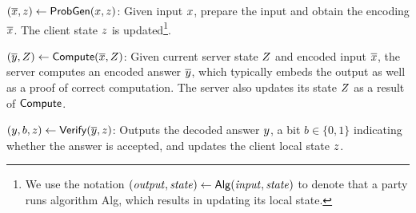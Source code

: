 \begin{description}
\item
$(\overline{x}, z) \leftarrow \mathsf{ProbGen}(x, z)$:
Given input $x$, prepare the input and obtain the encoding
$\overline{x}$.
The client state $z$ is updated\footnote{
We use the notation $({\it output}, \mathit{state}) \leftarrow {\sf Alg}({\it input}, \mathit{state})$
to denote that a party runs algorithm {\sf Alg}, which
results in updating its local state.
}.
\item
$(\overline{y}, Z)  \leftarrow \mathsf{Compute}(\overline{x}, Z)$:
Given %
current server state $Z$
and encoded input $\overline{x}$, the server
computes an encoded answer $\overline{y}$, which typically embeds the output
as well as a proof of correct computation.
The server also updates its state $Z$ as a result of $\mathsf{Compute}$.
\item
$(y, b, z) \leftarrow \mathsf{Verify}(\overline{y}, z)$:
Outputs the decoded answer $y$, a bit $b \in \{0, 1\}$ indicating
whether the answer is accepted, and updates the client local state
$z$.
\end{description}

